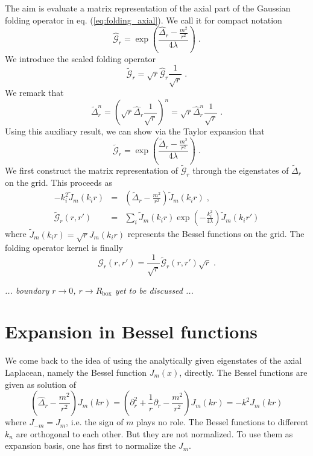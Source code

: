 \documentclass[12pt]{article}
\begin{document}
The aim is evaluate a matrix representation of the axial part of the
Gaussian folding operator in eq. (\ref{eq:folding_axial}). We call it
for compact notation
\begin{equation}
  \hat{\mathcal{G}}_r
  =
  \exp\left(\frac{\hat{\Delta}_r-\frac{m^2}{r^2}}{4\lambda}\right)
  \;.
\end{equation}
We introduce the scaled folding operator
\begin{equation}
  \tilde{\mathcal{G}}_r
  =
  \sqrt{r}\hat{\mathcal{G}}_r\frac{1}{\sqrt{r}}
  \;.
\end{equation}
We remark that
\begin{equation*}
  \tilde{\Delta}_r^n
  =
  \left(\sqrt{r}\hat{\Delta}_r\frac{1}{\sqrt{r}}\right)^n
  =
  \sqrt{r}\hat{\Delta}_r^n\frac{1}{\sqrt{r}}
  \;.
\end{equation*}
Using this auxiliary result, we can show via the Taylor expansion that
\begin{equation}
  \tilde{\mathcal{G}}_r
  =
  \exp\left(\frac{\tilde{\Delta}_r-\frac{m^2}{r^2}}{4\lambda}\right)
  \;.
\end{equation}
We first construct the matrix representation of
$\tilde{\mathcal{G}}_r$ through the eigenstates of $\tilde{\Delta}_r$
on the grid. This proceeds as
\begin{eqnarray*}
  -k_i^2\tilde{J}_m(k_ir)
  &=&
  \left(\tilde{\Delta}_r-\frac{m^2}{r^2}\right)\tilde{J}_m(k_ir)
  \;,
\\
  \tilde{\mathcal{G}}_r(r,r')
  &=&
  \sum_i\tilde{J}_m(k_ir)\exp\left(-\frac{k_i^2}{4\lambda}\right)
  \tilde{J}_m(k_ir')
\end{eqnarray*}
where $\tilde{J}_m(k_ir)=\sqrt{r}{J}_m(k_ir)$ represents the Bessel
functions on the grid.
The folding operator kernel is finally 
\begin{equation}
  {\mathcal{G}}_r(r,r')
  =
  \frac{1}{\sqrt{r}}\tilde{\mathcal{G}}_r(r,r')\sqrt{r}
  \;.
\end{equation}
\centerline{\em ... boundary $r\rightarrow 0$, $r\rightarrow
  R_\mathrm{box}$ yet to be discussed ...}

\section{Expansion in Bessel functions}

We come back to the idea of using the analytically given eigenstates 
of the axial Laplacean, namely the Bessel function $J_m(x)$,
directly. The Bessel functions are given as solution of
\begin{equation}
  \left(\hat{\Delta}_r-\frac{m^2}{r^2}\right)J_m(kr)
  =
  \left(
  \partial_r^2
  +
  \frac{1}{r}\partial_r
  -
  \frac{m^2}{r^2}
  \right)J_m(kr)
  =
  -k^2J_m(kr)
\end{equation}
where $J_{-m}=J_m$, i.e. the sign of $m$ plays no role.
The Bessel functions to different $k_n$ are orthogonal to each other.
But they are not normalized. To use them as expansion basis, one has 
first to normalize the $J_m$.
\end{document}
